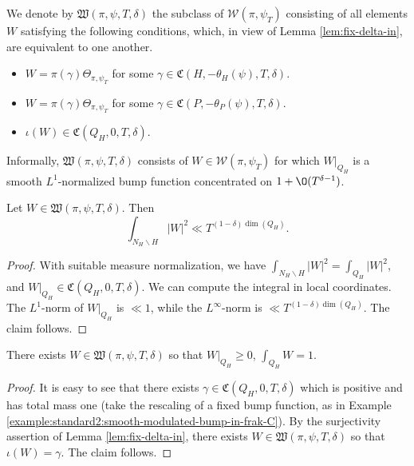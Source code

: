 \begin{definition}\label{defn:we-denote-mathfr-frakW}
  We denote by  $\mathfrak{W}(\pi,\psi,T,\delta)$ the subclass of $\mathcal{W}(\pi,\psi_T)$ consisting of all elements $W$ satisfying the following conditions, which, in view of Lemma \ref{lem:fix-delta-in}, are equivalent to one another.
  \begin{itemize}
  \item $W = \pi(\gamma) \Theta_{\pi,\psi_T}$ for some $\gamma \in \mathfrak{C}(H,-\theta_H(\psi),T,\delta)$.
  \item $W = \pi(\gamma) \Theta_{\pi,\psi_T}$ for some $\gamma \in \mathfrak{C}(P,-\theta_P(\psi),T,\delta)$.
  \item $\iota(W) \in \mathfrak{C}(Q_H, 0, T, \delta)$.
  \end{itemize}
\end{definition}
Informally, $\mathfrak{W}(\pi,\psi,T,\delta)$ consists of $W \in \mathcal{W}(\pi,\psi_T)$ for which $W|_{Q_H}$ is a smooth $L^1$-normalized bump function concentrated on $1 + \O(T^{\delta-1})$.

\begin{lemma}\label{lem:let-w-in-square-integral}
  Let $W \in \mathfrak{W}(\pi,\psi,T,\delta)$.  Then
  \begin{equation*}
    \int_{N_H \backslash H} |W|^2 \ll T^{(1- \delta) \dim(Q_H)}.
  \end{equation*}
\end{lemma}
\begin{proof}
  With suitable measure normalization, we have $\int_{N_H \backslash H} |W|^2 = \int_{Q_H} |W|^2$, and $W|_{Q_H} \in \mathfrak{C}(Q_H,0,T,\delta)$.  We can compute the integral in local coordinates.  The $L^1$-norm of $W|_{Q_H}$ is $\ll 1$, while the $L^\infty$-norm is $\ll T^{(1 - \delta) \dim(Q_H)}$.  The claim follows.
\end{proof}


\begin{lemma}\label{lem:there-exists-w-big-group-big}
  There exists $W \in \mathfrak{W}(\pi,\psi,T,\delta)$ so that $W|_{Q_H} \geq 0$, $\int_{Q_H} W = 1$.
\end{lemma}
\begin{proof}
  It is easy to see that there exists $\gamma \in \mathfrak{C}(Q_H,0,T,\delta)$ which is positive and has total mass one (take the rescaling of a fixed bump function, as in Example \ref{example:standard2:smooth-modulated-bump-in-frak-C}).  By the surjectivity assertion of Lemma \ref{lem:fix-delta-in}, there exists $W \in \mathfrak{W}(\pi,\psi,T,\delta)$ so that $\iota(W) = \gamma$.  The claim follows.
\end{proof}

